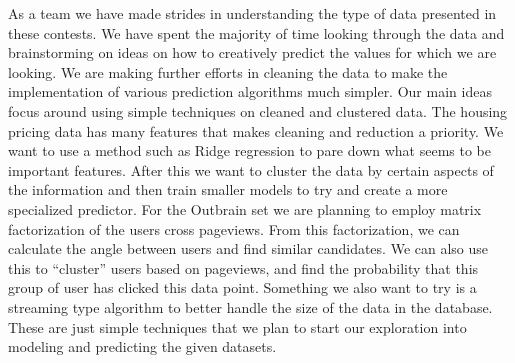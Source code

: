 \documentclass{article}
\begin{document}
As a team we have made strides in understanding the type of data presented in these contests. We have spent the majority of time looking through the data and brainstorming on ideas on how to creatively predict the values for which we are looking. We are making further efforts in cleaning the data to make the implementation of various prediction algorithms much simpler. Our main ideas focus around using simple techniques on cleaned and clustered data. The housing pricing data has many features that makes cleaning and reduction a priority. We want to use a method such as Ridge regression to pare down what seems to be important features.  After this we want to cluster the data by certain aspects of the information and then train smaller models to try and create a more specialized predictor. For the Outbrain set we are planning to employ matrix factorization of the users cross pageviews. From this factorization, we can calculate the angle between users and find similar candidates. We can also use this to “cluster” users based on pageviews, and find the probability that this group of user has clicked this data point. Something we also want to try is a streaming type algorithm to better handle the size of the data in the database. These are just simple techniques that we plan to start our exploration into modeling and predicting the given datasets.
\end{document}
